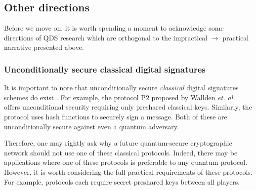 \subsection{Other directions}


%
%

Before we move on, it is worth spending a moment to acknowledge some directions of QDS research which are orthogonal to the impractical $\rightarrow$ practical narrative presented above.


\subsubsection*{Unconditionally secure classical digital signatures}
It is important to note that unconditionally secure \emph{classical} digital signatures schemes do exist \cite{Wallden2015, Amiri2016a}. For example, the protocol P$2$ proposed by Wallden \emph{et. al.} \cite{Wallden2015} offers unconditional security requiring only preshared classical keys. Similarly, the protocol \cite{Amiri2016a} uses hash functions to securely sign a message. %
Both of these are unconditionally secure against even a quantum adversary.

Therefore, one may rightly ask why a future quantum-secure cryptographic network should not use one of these classical protocols. Indeed, there may be applications where one of these protocols is preferable to any quantum protocol. However, it is worth considering the full practical requirements of these protocols. For example, protocols \cite{Wallden2015, Amiri2016a} each require secret preshared keys between all players.

